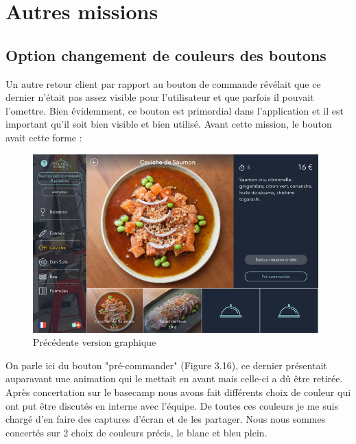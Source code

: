 \section{Autres missions}
\subsection{Option changement de couleurs des boutons}

Un autre retour client par rapport au bouton de commande révélait que ce dernier n'était pas assez visible pour l'utilisateur et que parfois il pouvait l'omettre. Bien évidemment, ce bouton est primordial dans l'application et il est important qu'il soit bien visible et bien utilisé. Avant cette mission, le bouton avait cette forme :

\begin{figure}[!htb]
  \centering
  \includegraphics[width=110mm,scale=0.5]{images/couleur_bouton.png}
  \caption{Précédente version graphique}
  \label{fig:boat1}
\end{figure}

On parle ici du bouton "pré-commander" (Figure 3.16), ce dernier présentait auparavant une animation qui le mettait en avant mais celle-ci a dû être retirée. Après concertation sur le basecamp nous avons fait différents choix de couleur qui ont put être discutés en interne avec l'équipe. De toutes ces couleurs je me suis chargé d'en faire des captures d'écran et de les partager. Nous nous sommes concertés sur 2 choix de couleurs précis, le blanc et bleu plein.


